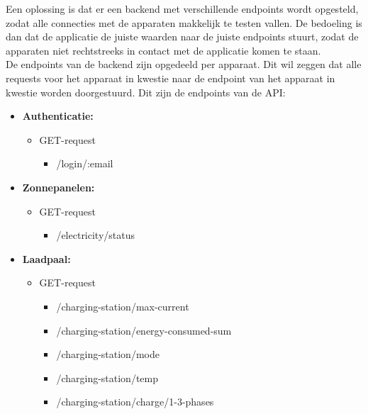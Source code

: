 Een oplossing is dat er een backend met verschillende endpoints wordt opgesteld, zodat alle connecties met de apparaten makkelijk te testen vallen. De bedoeling is dan dat de applicatie de juiste waarden naar de juiste endpoints stuurt, zodat de apparaten niet rechtstreeks in contact met de applicatie komen te staan.\\

De endpoints van de backend zijn opgedeeld per apparaat. Dit wil zeggen dat alle requests voor het apparaat in kwestie naar de endpoint van het apparaat in kwestie worden doorgestuurd. Dit zijn de endpoints van de API:

\begin{itemize}
    \item \textbf{Authenticatie:}
          \begin{itemize}
              \item GET-request
                    \begin{itemize}
                        \item /login/:email
                    \end{itemize}
          \end{itemize}
    \item \textbf{Zonnepanelen:}
          \begin{itemize}
              \item GET-request
                    \begin{itemize}
                        \item /electricity/status
                    \end{itemize}
          \end{itemize}
    \item \textbf{Laadpaal:}
          \begin{itemize}
              \item GET-request
                    \begin{itemize}
                        \item /charging-station/max-current
                        \item /charging-station/energy-consumed-sum
                        \item /charging-station/mode
                        \item /charging-station/temp
                        \item /charging-station/charge/1-3-phases
                    \end{itemize}

\end{itemize}
\end{itemize}
